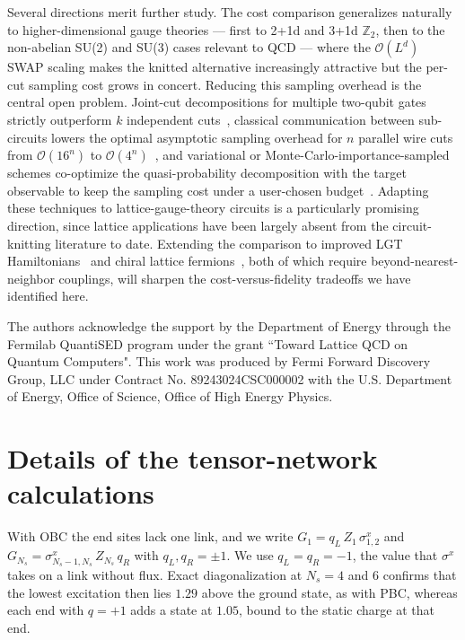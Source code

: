 \documentclass[twocolumn,superscriptaddress,showpacs,nofootinbib,notitlepage,preprintnumbers,secnumarabic,amssymb, floatfix, nobibnotes, aps, prd]{revtex4-2}
\begin{document}
Several directions merit further study.  The cost comparison
generalizes naturally to higher-dimensional gauge theories --- first
to 2+1d and 3+1d $\mathbb{Z}_2$, then to the non-abelian SU(2) and
SU(3) cases relevant to QCD --- where the $\mathcal{O}(L^d)$ SWAP
scaling makes the knitted alternative increasingly attractive but the
per-cut sampling cost grows in concert.  Reducing this sampling
overhead is the central open problem.  Joint-cut decompositions for
multiple two-qubit gates strictly outperform $k$ independent
cuts~\cite{Schmitt:2023urx}, classical communication between
sub-circuits lowers the optimal asymptotic sampling overhead for $n$ parallel wire cuts from
$\mathcal{O}(16^n)$ to
$\mathcal{O}(4^n)$~\cite{Brenner:2023txj,Harada:2023yqg}, and
variational or Monte-Carlo-importance-sampled schemes co-optimize the
quasi-probability decomposition with the target observable to keep the
sampling cost under a user-chosen budget~\cite{Gentinetta:2023gne}.
Adapting these techniques to lattice-gauge-theory circuits is a
particularly promising direction, since lattice applications have been
largely absent from the circuit-knitting literature to date.
Extending the comparison to improved LGT
Hamiltonians~\cite{Carena:2022kpg,Gustafson:2023aai,Ciavarella:2023mfc,Illa:2025dou,Illa:2025njz}
and chiral lattice fermions~\cite{Clancy:2023kla,Singh:2025sye,Lamm:2026qsp}, both
of which require beyond-nearest-neighbor couplings, will sharpen the
cost-versus-fidelity tradeoffs we have identified here.

\begin{acknowledgments}
The authors acknowledge the support by the Department of Energy through the Fermilab QuantiSED program under the grant ``Toward Lattice QCD on Quantum Computers". This work was produced by Fermi Forward Discovery Group, LLC under Contract No. 89243024CSC000002 with the U.S. Department of Energy, Office of Science, Office of High Energy Physics. 
\end{acknowledgments}

\appendix

\section{Details of the tensor-network calculations}
\label{app:dmrg}

With OBC the end sites lack one link, and we write $G_1=q_L\,Z_1\,\sigma^{x}_{1,2}$ and $G_{N_s}=\sigma^{x}_{N_s-1,N_s}\,Z_{N_s}\,q_R$ with $q_L,q_R=\pm1$.
We use $q_L=q_R=-1$, the value that $\sigma^x$ takes on a link without flux.
Exact diagonalization at $N_s=4$ and $6$ confirms that the lowest excitation then lies $1.29$ above the ground state, as with PBC, whereas each end with $q=+1$ adds a state at $1.05$, bound to the static charge at that end.
\end{document}
